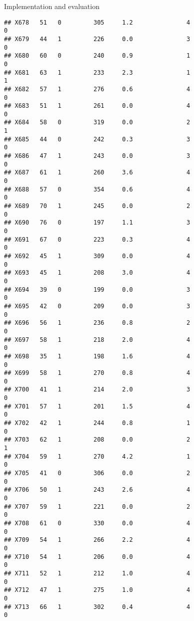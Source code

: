 \documentclass[
  ignorenonframetext,
]{beamer}
\begin{document}
\begin{frame}[fragile]{Implementation and evaluation}
\begin{verbatim}
## X678   51   0         305     1.2               4                   0
## X679   44   1         226     0.0               3                   0
## X680   60   0         240     0.9               1                   0
## X681   63   1         233     2.3               1                   1
## X682   57   1         276     0.6               4                   0
## X683   51   1         261     0.0               4                   0
## X684   58   0         319     0.0               2                   1
## X685   44   0         242     0.3               3                   0
## X686   47   1         243     0.0               3                   0
## X687   61   1         260     3.6               4                   0
## X688   57   0         354     0.6               4                   0
## X689   70   1         245     0.0               2                   0
## X690   76   0         197     1.1               3                   0
## X691   67   0         223     0.3               4                   0
## X692   45   1         309     0.0               4                   0
## X693   45   1         208     3.0               4                   0
## X694   39   0         199     0.0               3                   0
## X695   42   0         209     0.0               3                   0
## X696   56   1         236     0.8               2                   0
## X697   58   1         218     2.0               4                   0
## X698   35   1         198     1.6               4                   0
## X699   58   1         270     0.8               4                   0
## X700   41   1         214     2.0               3                   0
## X701   57   1         201     1.5               4                   0
## X702   42   1         244     0.8               1                   0
## X703   62   1         208     0.0               2                   1
## X704   59   1         270     4.2               1                   0
## X705   41   0         306     0.0               2                   0
## X706   50   1         243     2.6               4                   0
## X707   59   1         221     0.0               2                   0
## X708   61   0         330     0.0               4                   0
## X709   54   1         266     2.2               4                   0
## X710   54   1         206     0.0               4                   0
## X711   52   1         212     1.0               4                   0
## X712   47   1         275     1.0               4                   0
## X713   66   1         302     0.4               4                   0

\end{verbatim}
\end{frame}
\end{document}

